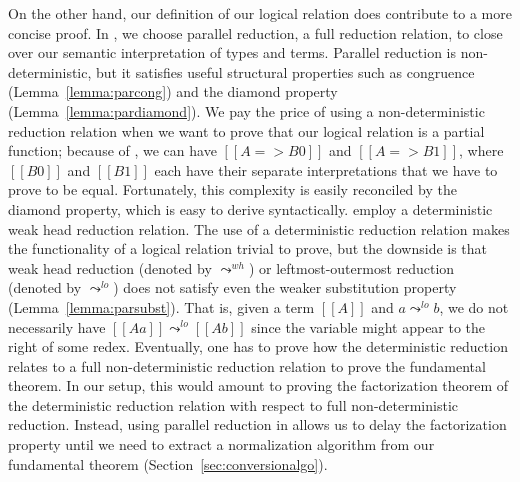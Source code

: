 \documentclass[acmsmall,screen=true,
\ifpublic review=false\else,review=true\fi
  ,anonymous=\ifanonymous true\else false\fi]{acmart}
\begin{document}
On the other hand, our definition of our logical relation does
contribute to a more concise proof.
In , we choose parallel reduction, a full
reduction relation, to close over our semantic interpretation of types
and terms. Parallel reduction is non-deterministic, but it satisfies
useful structural properties such as congruence
(Lemma~\ref{lemma:parcong}) and the diamond property
(Lemma~\ref{lemma:pardiamond}). We pay the price of using a
non-deterministic reduction relation when we want to prove that our
logical relation is a partial function; because of , we
can have $[[A => B0]]$ and $[[A => B1]]$, where $[[B0]]$ and $[[B1]]$
each have their separate interpretations that we have to prove to be
equal. Fortunately, this complexity is easily reconciled by the
diamond property, which is easy to derive syntactically.
\citet{decagda,nbeincoq} employ a deterministic weak
head reduction relation. The use of a deterministic reduction relation
makes the functionality of a logical relation trivial to prove, but
the downside is that weak head reduction (denoted by $\leadsto^{wh}$)
or leftmost-outermost reduction (denoted by $\leadsto^{lo}$) does
not satisfy even the weaker substitution property
(Lemma~\ref{lemma:parsubst}). That is, given a term $[[A]]$
and $a \leadsto^{lo} b$, we do not necessarily have $[[A {a}]]
\leadsto^{lo} [[A {b}]]$ since the variable might appear to the
right of some redex. Eventually, one has to prove how the
deterministic reduction relates to a full non-deterministic reduction
relation to prove the fundamental theorem. In our setup, this would amount
to proving the factorization theorem of the deterministic reduction
relation with respect to full non-deterministic reduction. Instead,
using parallel reduction in  allows us to delay the
factorization property until we need to extract a normalization
algorithm from our fundamental theorem (Section~\ref{sec:conversionalgo}).




\end{document}
